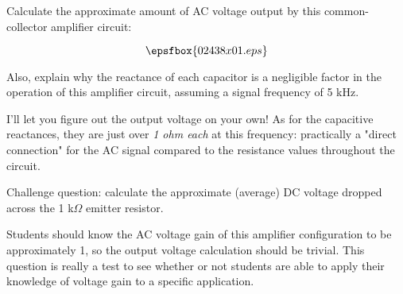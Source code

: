 

Calculate the approximate amount of AC voltage output by this common-collector amplifier circuit:

$$\epsfbox{02438x01.eps}$$

Also, explain why the reactance of each capacitor is a negligible factor in the operation of this amplifier circuit, assuming a signal frequency of 5 kHz.







I'll let you figure out the output voltage on your own!  As for the capacitive reactances, they are just over {\it 1 ohm each} at this frequency: practically a "direct connection" for the AC signal compared to the resistance values throughout the circuit.

\vskip 10pt

Challenge question: calculate the approximate (average) DC voltage dropped across the 1 k$\Omega$ emitter resistor.







Students should know the AC voltage gain of this amplifier configuration to be approximately 1, so the output voltage calculation should be trivial.  This question is really a test to see whether or not students are able to apply their knowledge of voltage gain to a specific application.





